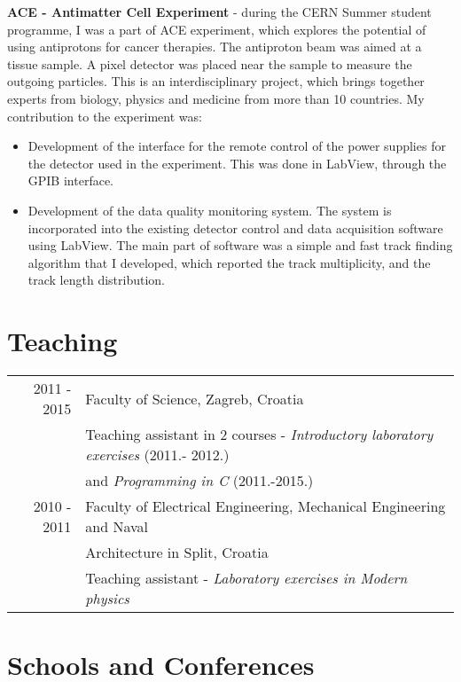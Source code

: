 \documentclass[letterpaper,12pt]{article}
\begin{document}
\textbf{ACE - Antimatter Cell Experiment} -  during the CERN Summer student programme, I was a part of ACE experiment, which explores the potential of using antiprotons for cancer therapies. The antiproton beam was aimed at a tissue sample. A pixel detector was placed near the sample to measure the outgoing particles. This is an interdisciplinary project, which brings together experts from biology, physics and medicine from more than 10 countries. My contribution to the experiment was:
\begin{itemize}
\item Development of the interface for the remote control of the power supplies for the detector used in the experiment. This was done in LabView, through the GPIB interface.
\item Development of the data quality monitoring system. The system is incorporated into the existing detector control and data acquisition software using LabView. The main part of software was a simple and fast track finding algorithm that I developed, which reported the track multiplicity, and the track length distribution.  
\end{itemize}

\section*{Teaching}

\begin{tabular}{r | l}
  2011 - 2015 & Faculty of Science, Zagreb, Croatia \\ & Teaching assistant in 2 courses - \textit{Introductory laboratory exercises} (2011.- 2012.) \\ & and \textit{Programming in C} (2011.-2015.) \\[5pt]
  2010 - 2011 & Faculty of Electrical Engineering, Mechanical Engineering and Naval \\ & Architecture in Split, Croatia \\ & Teaching assistant - \textit{Laboratory exercises in Modern physics}
\end{tabular}

\section*{Schools and Conferences}
\end{document}
